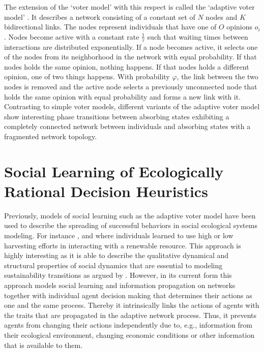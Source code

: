 The extension of the `voter model' with this respect is called the `adaptive voter model' \citep{Holme2006a, Bohme2011, Rogers2013, Klamser2016, Min2017}. It describes a network consisting of a constant set of $N$ nodes and $K$ bidirectional links. The nodes represent individuals that have one of $O$ opinions $o_i$. Nodes become active with a constant rate $\frac{1}{\tau}$ such that waiting times between interactions are distributed exponentially. If a node becomes active, it selects one of the nodes from its neighborhood in the network with equal probability. If that nodes holds the same opinion, nothing happens. If that nodes holds a different opinion, one of two things happens. With probability $\varphi$, the link between the two nodes is removed and the active node selects a previously unconnected node that holds the same opinion with equal probability and forms a new link with it.
Contrasting to simple voter models, different variants of the adaptive voter model show interesting phase transitions between absorbing states exhibiting a completely connected network between individuals and absorbing states with a fragmented network topology.

\section{Social Learning of Ecologically Rational Decision Heuristics}

Previously, models of social learning such as the adaptive voter model have been used to describe the spreading of successful behaviors in social ecological systems modeling. For instance \cite{Wiedermann2015}, \cite{Barfuss2017} and \cite{Geier2019} where individuals learned to use high or low harvesting efforts in interacting with a renewable resource. This approach is highly interesting as it is able to describe the qualitative dynamical and structural properties of social dynamics that are essential to modeling sustainability transitions as argued by \cite{Lade2017}.
However, in its current form this approach models social learning and information propagation on networks together with individual agent decision making that determines their actions as one and the same process. Thereby it intrinsically links the actions of agents with the traits that are propagated in the adaptive network process. Thus, it prevents agents from changing their actions independently due to, e.g., information from their ecological environment, changing economic conditions or other information that is available to them. 

